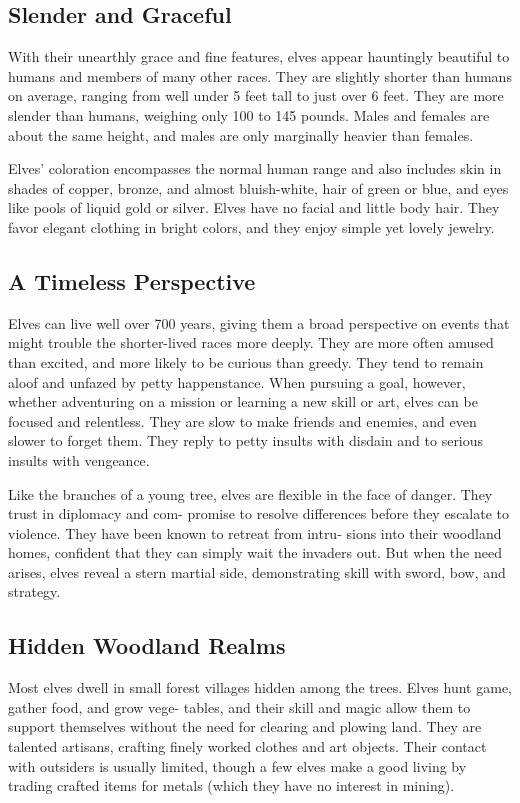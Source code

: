\subsection{Slender and Graceful}
With their unearthly grace and fine features, elves appear hauntingly beautiful to humans and members of many other races. They are slightly shorter than humans on average, ranging from well under 5 feet tall to just over 6 feet. They are more slender than humans, weighing only 100 to 145 pounds. Males and females are about the same height, and males are only marginally heavier than females.

Elves’ coloration encompasses the normal human range and also includes skin in shades of copper, bronze, and almost bluish-white, hair of green or blue, and eyes like pools of liquid gold or silver. Elves have no facial and little body hair. They favor elegant clothing in bright colors, and they enjoy simple yet lovely jewelry.

\subsection{A Timeless Perspective}
Elves can live well over 700 years, giving them a broad perspective on events that might trouble the shorter-lived races more deeply. They are more often amused than excited, and more likely to be curious than greedy. They tend to remain aloof and unfazed by petty happenstance. When pursuing a goal, however, whether adventuring on a mission or learning a new skill or art, elves can be focused and relentless. They are slow to make friends and enemies, and even slower to forget them. They reply to petty insults with disdain and to serious insults with vengeance.

Like the branches of a young tree, elves are flexible in the face of danger. They trust in diplomacy and com- promise to resolve differences before they escalate to violence. They have been known to retreat from intru- sions into their woodland homes, confident that they can simply wait the invaders out. But when the need arises, elves reveal a stern martial side, demonstrating skill with sword, bow, and strategy.

\subsection{Hidden Woodland Realms}
Most elves dwell in small forest villages hidden among the trees. Elves hunt game, gather food, and grow vege- tables, and their skill and magic allow them to support themselves without the need for clearing and plowing land. They are talented artisans, crafting finely worked clothes and art objects. Their contact with outsiders is usually limited, though a few elves make a good living by trading crafted items for metals (which they have no interest in mining).

